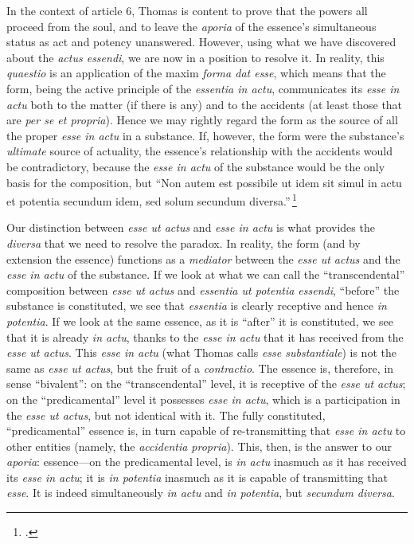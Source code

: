 In the context of article 6, Thomas is content to prove that the powers all proceed from the soul, and to leave the \emph{aporia} of the essence's simultaneous status as act and potency unanswered. However, using what we have discovered about the \emph{actus essendi}, we are now in a position to resolve it. In reality, this \emph{quaestio} is an application of the maxim \emph{forma dat esse}, which means that the form, being the active principle of the \emph{essentia in actu}, communicates its \emph{esse in actu} both to the matter (if there is any) and to the accidents (at least those that are \emph{per se et propria}). Hence we may rightly regard the form as the source of all the proper \emph{esse in actu} in a substance. If, however, the form were the substance's \emph{ultimate} source of actuality, the essence's relationship with the accidents would be contradictory, because the \emph{esse in actu} of the substance would be the only basis for the composition, but ``Non autem est possibile ut idem sit simul in actu et potentia secundum idem, sed solum secundum diversa.''\,\footcite[I, q.~2, a.~3, co.]{st:summa}

Our distinction between \emph{esse ut actus} and \emph{esse in actu} is what provides the \emph{diversa} that we need to resolve the paradox. In reality, the form (and by extension the essence) functions as a \emph{mediator} between the \emph{esse ut actus} and the \emph{esse in actu} of the substance. If we look at what we can call the ``transcendental'' composition between \emph{esse ut actus} and \emph{essentia ut potentia essendi}, ``before'' the substance is constituted, we see that \emph{essentia} is clearly receptive and hence \emph{in potentia}. If we look at the same essence, as it is ``after'' it is constituted, we see that it is already \emph{in actu}, thanks to the \emph{esse in actu} that it has received from the \emph{esse ut actus}. This \emph{esse in actu} (what Thomas calls \emph{esse substantiale}) is not the same as \emph{esse ut actus}, but the fruit of a \emph{contractio}. The essence is, therefore, in sense ``bivalent'': on the ``transcendental'' level, it is receptive of the \emph{esse ut actus}; on the ``predicamental'' level it possesses \emph{esse in actu}, which is a participation in the \emph{esse ut actus}, but not identical with it. The fully constituted, ``predicamental'' essence is, in turn capable of re-transmitting that \emph{esse in actu} to other entities (namely, the \emph{accidentia propria}). This, then, is the answer to our \emph{aporia}: essence---on the predicamental level, is \emph{in actu} inasmuch as it has received its \emph{esse in actu}; it is \emph{in potentia} inasmuch as it is capable of transmitting that \emph{esse}. It is indeed simultaneously \emph{in actu} and \emph{in potentia}, but \emph{secundum diversa}.

